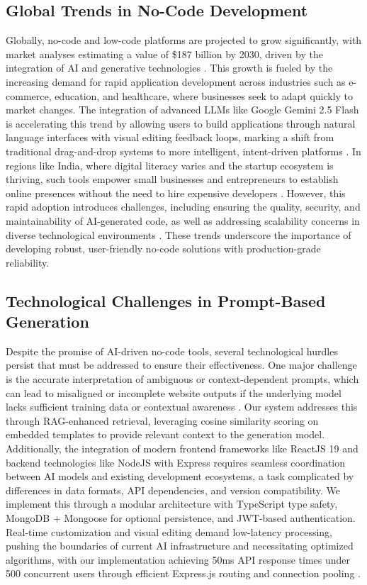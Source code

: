 \documentclass[10pt, conference, letterpaper]{IEEEtran}
\begin{document}
\subsection{Global Trends in No-Code Development}
Globally, no-code and low-code platforms are projected to grow significantly, with market analyses estimating a value of \$187 billion by 2030, driven by the integration of AI and generative technologies \cite{forbes2025prompt}. This growth is fueled by the increasing demand for rapid application development across industries such as e-commerce, education, and healthcare, where businesses seek to adapt quickly to market changes. The integration of advanced LLMs like Google Gemini 2.5 Flash is accelerating this trend by allowing users to build applications through natural language interfaces with visual editing feedback loops, marking a shift from traditional drag-and-drop systems to more intelligent, intent-driven platforms \cite{newstack2025nocode}. In regions like India, where digital literacy varies and the startup ecosystem is thriving, such tools empower small businesses and entrepreneurs to establish online presences without the need to hire expensive developers \cite{erontechnosolutions2025future}. However, this rapid adoption introduces challenges, including ensuring the quality, security, and maintainability of AI-generated code, as well as addressing scalability concerns in diverse technological environments \cite{bubbleiodeveloper2025ai}. These trends underscore the importance of developing robust, user-friendly no-code solutions with production-grade reliability.

\subsection{Technological Challenges in Prompt-Based Generation}
Despite the promise of AI-driven no-code tools, several technological hurdles persist that must be addressed to ensure their effectiveness. One major challenge is the accurate interpretation of ambiguous or context-dependent prompts, which can lead to misaligned or incomplete website outputs if the underlying model lacks sufficient training data or contextual awareness \cite{aiap2025}. Our system addresses this through RAG-enhanced retrieval, leveraging cosine similarity scoring on embedded templates to provide relevant context to the generation model. Additionally, the integration of modern frontend frameworks like ReactJS 19 and backend technologies like NodeJS with Express requires seamless coordination between AI models and existing development ecosystems, a task complicated by differences in data formats, API dependencies, and version compatibility. We implement this through a modular architecture with TypeScript type safety, MongoDB + Mongoose for optional persistence, and JWT-based authentication. Real-time customization and visual editing demand low-latency processing, pushing the boundaries of current AI infrastructure and necessitating optimized algorithms, with our implementation achieving 50ms API response times under 500 concurrent users through efficient Express.js routing and connection pooling \cite{democratizing2025}.
\end{document}
